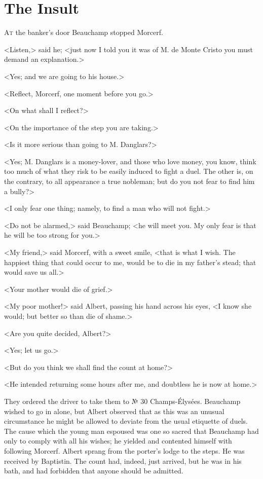 \chapter{The Insult} 

 \lettrine{A}{t} the banker's door Beauchamp stopped Morcerf. 

\zz
 <Listen,> said he; <just now I told you it was of M. de Monte Cristo you must demand an explanation.> 

\zz
 <Yes; and we are going to his house.> 

 <Reflect, Morcerf, one moment before you go.> 

 <On what shall I reflect?> 

 <On the importance of the step you are taking.> 

 <Is it more serious than going to M. Danglars?> 

 <Yes; M. Danglars is a money-lover, and those who love money, you know, think too much of what they risk to be easily induced to fight a duel. The other is, on the contrary, to all appearance a true nobleman; but do you not fear to find him a bully?> 

 <I only fear one thing; namely, to find a man who will not fight.> 

 <Do not be alarmed,> said Beauchamp; <he will meet you. My only fear is that he will be too strong for you.> 

 <My friend,> said Morcerf, with a sweet smile, <that is what I wish. The happiest thing that could occur to me, would be to die in my father's stead; that would save us all.> 

 <Your mother would die of grief.> 

 <My poor mother!> said Albert, passing his hand across his eyes, <I know she would; but better so than die of shame.> 

 <Are you quite decided, Albert?> 

 <Yes; let us go.> 

 <But do you think we shall find the count at home?> 

 <He intended returning some hours after me, and doubtless he is now at home.> 

 They ordered the driver to take them to № 30 Champs-Élysées. Beauchamp wished to go in alone, but Albert observed that as this was an unusual circumstance he might be allowed to deviate from the usual etiquette of duels. The cause which the young man espoused was one so sacred that Beauchamp had only to comply with all his wishes; he yielded and contented himself with following Morcerf. Albert sprang from the porter's lodge to the steps. He was received by Baptistin. The count had, indeed, just arrived, but he was in his bath, and had forbidden that anyone should be admitted. 

